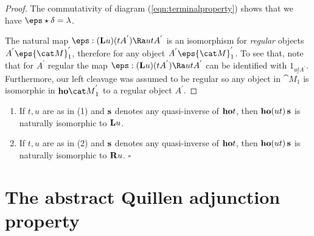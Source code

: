 \begin{proof}
The commutativity of diagram (\ref{eqn:terminalproperty}) shows that we have $\eps \star \delta = \lambda$. 

The natural map $\eps: ({\bf L}u)(tA^{'}) \Ra utA^{'}$ is an isomorphism for {\it regular} objects $A^{'} \eps {\cat M}^{'}_1$, therefore for any object $A^{'}  \eps {\cat M}^{'}_1$. To see that, note that for $A^{'}$ regular the map $\eps: ({\bf L}u)(tA^{'}) \Ra utA^{'}$ can be identified with $1_{utA^{'}}$. Furthermore, our left cleavage was assumed to be regular so any object in ${\cat M}^{'}_1$ is isomorphic in ${\bf ho}{\cat M}^{'}_1$ to a regular object $A^{'}$.
\end{proof}

\begin{cor}
\label{cor:generalexistenceleftderived}
\mbox{}
\begin{enumerate}
\item
If $t, u$ are as in  (1) and ${\bf s}$ denotes any quasi-inverse of ${\bf ho}t$, then ${\bf ho}(ut) \, {\bf s}$ is naturally isomorphic to ${\bf L}u$.
\item
If $t, u$ are as in  (2) and ${\bf s}$ denotes any quasi-inverse of ${\bf ho}t$, then ${\bf ho}(ut) \, {\bf s}$ is naturally isomorphic to ${\bf R}u$. $\square$
\end{enumerate}
\end{cor}

\section{The abstract Quillen adjunction property}

